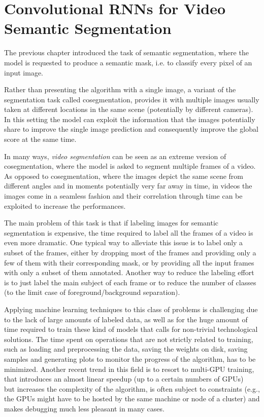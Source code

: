 \chapter{Convolutional RNNs for Video Semantic Segmentation}\label{sec:video_segmentation}

The previous chapter introduced the task of semantic segmentation, where the
model is requested to produce a semantic mask, i.e. to classify every pixel of
an input image.

Rather than presenting the algorithm with a single image, a variant of the
segmentation task called cosegmentation, provides it with multiple images
usually taken at different locations in the same scene (potentially by
different cameras). In this setting the model can exploit the information that
the images potentially share to improve the single image prediction and
consequently improve the global score at the same time.

In many ways, \emph{video segmentation} can be seen as an extreme version of
cosegmentation, where the model is asked to segment multiple frames of a video.
As opposed to cosegmentation, where the images depict the same scene from
different angles and in moments potentially very far away in time, in videos the
images come in a seamless fashion and their correlation through time can be
exploited to increase the performances.

The main problem of this task is that if labeling images for semantic
segmentation is expensive, the time required to label all the frames of a
video is even more dramatic. One typical way to alleviate this issue is to
label only a subset of the frames, either by dropping most of the frames and
providing only a few of them with their corresponding mask, or by providing all
the input frames with only a subset of them annotated. Another way to reduce
the labeling effort is to just label the main subject of each frame or to
reduce the number of classes (to the limit case of foreground/background
separation).

Applying machine learning techniques to this class of problems is challenging
due to the lack of large amounts of labeled data, as well as for the huge
amount of time required to train these kind of models that calls for
non-trivial technological solutions. The time spent on operations that are not
strictly related to training, such as loading and preprocessing the data,
saving the weights on disk, saving samples and generating plots to monitor the
progress of the algorithm, has to be minimized. Another recent trend in this
field is to resort to multi-GPU training, that introduces an almost linear
speedup (up to a certain numbers of GPUs)~\cite{theano2016short,ma2016theano}
but increases the complexity of the algorithm, is often subject to constraints
(e.g., the GPUs might have to be hosted by the same machine or node of a
cluster) and makes debugging much less pleasant in many cases.

